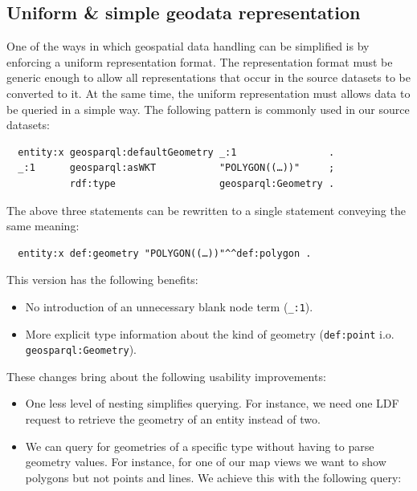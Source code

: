 \documentclass[a4paper]{scrartcl}
\newcommand{\textt}[1]{{\small \texttt{#1}}}
\begin{document}
\subsection{Uniform \& simple geodata representation}

One of the ways in which geospatial data handling can be simplified is
by enforcing a uniform representation format.  The representation
format must be generic enough to allow all representations that occur
in the source datasets to be converted to it.  At the same time, the
uniform representation must allows data to be queried in a simple way.
The following pattern is commonly used in our source datasets:

\begin{verbatim}
  entity:x geosparql:defaultGeometry _:1                .
  _:1      geosparql:asWKT           "POLYGON((…))"     ;
           rdf:type                  geosparql:Geometry .
\end{verbatim}

The above three statements can be rewritten to a single statement
conveying the same meaning:

\begin{verbatim}
  entity:x def:geometry "POLYGON((…))"^^def:polygon .
\end{verbatim}

This version has the following benefits:

\begin{itemize}

\item No introduction of an unnecessary blank node term (\textt{\_:1}).

\item More explicit type information about the kind of geometry
  (\textt{def:point} i.o. \textt{geosparql:Geometry}).

\end{itemize}

These changes bring about the following usability improvements:

\begin{itemize}
  
\item One less level of nesting simplifies querying.  For instance, we
  need one LDF request to retrieve the geometry of an entity instead
  of two.

\item We can query for geometries of a specific type without having to
  parse geometry values.  For instance, for one of our map views we
  want to show polygons but not points and lines.  We achieve this
  with the following query:

\end{itemize}
\end{document}
